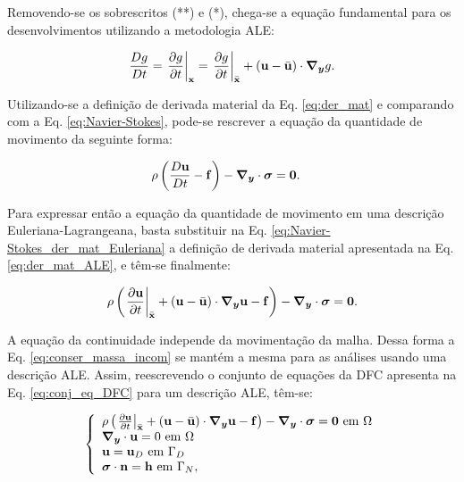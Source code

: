 \documentclass[tese_patricia]{subfiles}%
\begin{document}
Removendo-se os sobrescritos (**) e (*), chega-se a equação fundamental para os desenvolvimentos utilizando a metodologia ALE:

\begin{align}
	\frac{Dg}{Dt} = \left . \frac{\partial g}{\partial t} \right|_{\mathbf{x}} = \left . \frac{\partial g}{\partial t} \right|_{\bar{\mathbf{x}}} + \left(\mathbf{u} - \bar{\mathbf{u}} \right) \cdot \boldsymbol{\nabla_y} g. \label{eq:der_mat_ALE}
\end{align}

Utilizando-se a definição de derivada material da Eq. \ref{eq:der_mat} e comparando com a Eq. \ref{eq:Navier-Stokes}, pode-se rescrever a equação da quantidade de movimento da seguinte forma:

\begin{align}
	\rho\left(\frac{D\mathbf{u}}{Dt} - \mathbf{f} \right) - \boldsymbol{\nabla_y} \cdot \boldsymbol{\sigma} &= \mathbf{0}. \label{eq:Navier-Stokes_der_mat_Euleriana}
\end{align}

Para expressar então a equação da quantidade de movimento em uma descrição Euleriana-Lagrangeana, basta substituir na Eq. \ref{eq:Navier-Stokes_der_mat_Euleriana} a definição de derivada material apresentada na Eq. \ref{eq:der_mat_ALE}, e têm-se finalmente:

\begin{align}
	\rho\left(\left. \frac{\partial\mathbf{u}}{\partial t} \right|_{\bar{\mathbf{x}}} + \left(\mathbf{u} - \bar{\mathbf{u}} \right) \cdot \boldsymbol{\nabla_y}  \mathbf{u}  - \mathbf{f} \right) - \boldsymbol{\nabla_y} \cdot \boldsymbol{\sigma} = \mathbf{0}. \label{eq:Navier-Stokes_ALE} 
\end{align}

A equação da continuidade independe da movimentação da malha. Dessa forma a Eq. \ref{eq:conser_massa_incom} se mantém a mesma para as análises usando uma descrição ALE. Assim, reescrevendo o conjunto de equações da DFC apresenta na Eq. \ref{eq:conj_eq_DFC} para um descrição ALE, têm-se:

\begin{equation}
	\left\{
	\begin{array}{l}
		\density\left( \left. \frac{\partial\velocity}{\partial t} \right|_{\posALE}  + \left(\velocity - \velocityALE \right)\cdot\gradient\velocity - \sbodyforce \right) - \divergence \cdot \stressTensor = \vzero  \ \textrm{em} \ \domain\\
		\divergence \cdot \velocity = 0  \ \textrm{em} \ \domain\\
		\velocity = \velocityD \ \textrm{em} \ \boundaryD \\
		\stressTensor \cdot \snormal = \surfaceLoad \ \textrm{em} \ \boundaryN,
	\end{array} \label{eq:conj_eq_DFC_ALE}
	\right.
\end{equation}
\end{document}
